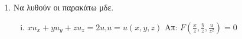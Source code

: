 \begin{enumerate}
\item Να λυθούν οι παρακάτω μδε.

\begin{enumerate}[i)]
  \item $xu_{x}+yu_{y}+zu_{z}=2u$,\quad $u=u(x,y,z)$ \hfill Απ: $F(\frac{x}{z},\frac{y}{z},\frac{u}{z^{2}})=0$
\end{enumerate}

\end{enumerate}


